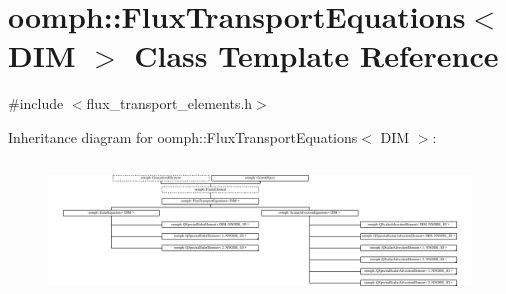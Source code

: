 \hypertarget{classoomph_1_1FluxTransportEquations}{}\section{oomph\+:\+:Flux\+Transport\+Equations$<$ D\+IM $>$ Class Template Reference}
\label{classoomph_1_1FluxTransportEquations}


{\ttfamily \#include $<$flux\+\_\+transport\+\_\+elements.\+h$>$}

Inheritance diagram for oomph\+:\+:Flux\+Transport\+Equations$<$ D\+IM $>$\+:\begin{figure}[H]
\begin{center}
\leavevmode
\includegraphics[height=3.664922cm]{classoomph_1_1FluxTransportEquations}
\end{center}
\end{figure}
